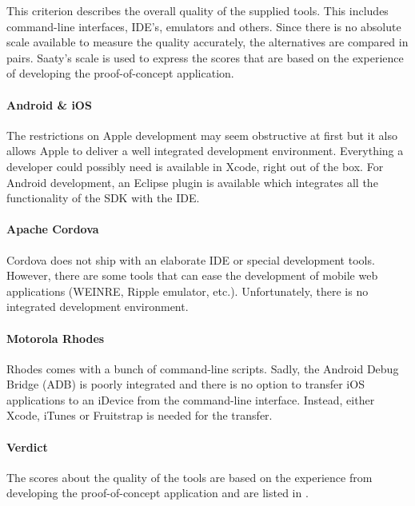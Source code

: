 This criterion describes the overall quality of the supplied tools. This includes command-line interfaces, IDE's, emulators and others. Since there is no absolute scale available to measure the quality accurately, the alternatives are compared in pairs. Saaty's scale is used to express the scores that are based on the experience of developing the proof-of-concept application.

\paragraph{Android \& iOS} The restrictions on Apple development may seem obstructive at first but it also allows Apple to deliver a well integrated development environment. Everything a developer could possibly need is available in Xcode, right out of the box. For Android development, an Eclipse plugin is available which integrates all the functionality of the SDK with the IDE. 

\paragraph{Apache Cordova} Cordova does not ship with an elaborate IDE or special development tools. However, there are some tools that can ease the development of mobile web applications (WEINRE, Ripple emulator, etc.). Unfortunately, there is no integrated development environment. 

\paragraph{Motorola Rhodes} Rhodes comes with a bunch of command-line scripts. Sadly, the Android Debug Bridge (ADB) is poorly integrated  and there is no option to transfer iOS applications to an iDevice from the command-line interface. Instead, either Xcode, iTunes or Fruitstrap is needed for the transfer. 


\paragraph{Verdict} The scores about the quality of the tools are based on the experience from developing the proof-of-concept application and are listed in . 

